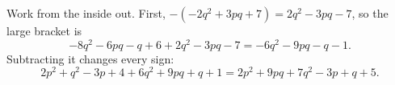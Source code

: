 Work from the inside out. First, $-\left(-2q^2+3pq+7\right)=2q^2-3pq-7$, so the large bracket is
\[
-8q^2-6pq-q+6+2q^2-3pq-7=-6q^2-9pq-q-1 .
\]
Subtracting it changes every sign:
\[
2p^2+q^2-3p+4+6q^2+9pq+q+1=\boxed{2p^2+9pq+7q^2-3p+q+5}.
\]
